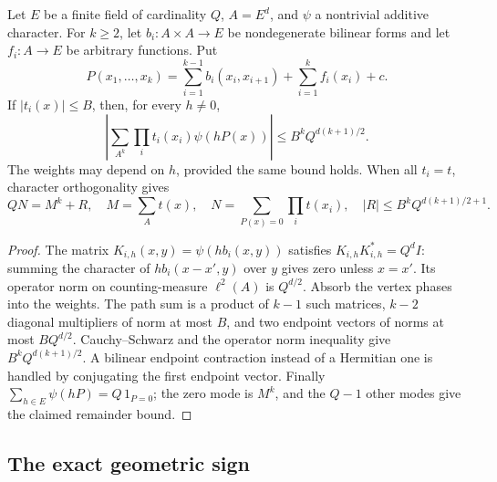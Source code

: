 \begin{lemma}
\label{lem:path}
Let $E$ be a finite field of cardinality $Q$, $A=E^d$, and $\psi$ a
nontrivial additive character.  For $k\ge2$, let $b_i:A\times A\to E$
be nondegenerate bilinear forms and let $f_i:A\to E$ be arbitrary
functions.  Put
\[
 P(x_1,\ldots,x_k)=\sum_{i=1}^{k-1}b_i(x_i,x_{i+1})
                         +\sum_{i=1}^k f_i(x_i)+c.
\]
If $|t_i(x)|\le B$, then, for every $h\ne0$,
\[
 \left|\sum_{A^k}\prod_i t_i(x_i)\psi(hP(x))\right|
       \le B^k Q^{d(k+1)/2}.
\]
The weights may depend on $h$, provided the same bound holds.  When all
$t_i=t$, character orthogonality gives
\[
 QN=M^k+R,\quad M=\sum_A t(x),\quad
 N=\sum_{P(x)=0}\prod_i t(x_i),\quad
 |R|\le B^k Q^{d(k+1)/2+1}.
\]
\end{lemma}
\begin{proof}
The matrix $K_{i,h}(x,y)=\psi(hb_i(x,y))$ satisfies
$K_{i,h}K_{i,h}^*=Q^d I$: summing the character of
$hb_i(x-x',y)$ over $y$ gives zero unless $x=x'$.  Its operator norm on
counting-measure $\ell^2(A)$ is $Q^{d/2}$.  Absorb the vertex phases into
the weights.  The path sum is a product of $k-1$ such matrices,
$k-2$ diagonal multipliers of norm at most $B$, and two endpoint vectors
of norms at most $BQ^{d/2}$.  Cauchy--Schwarz and the operator norm
inequality give $B^kQ^{d(k+1)/2}$.  A bilinear endpoint contraction instead
of a Hermitian one is handled by conjugating the first endpoint vector.
Finally
$\sum_{h\in E}\psi(hP)=Q\,1_{P=0}$; the zero mode is $M^k$, and the
$Q-1$ other modes give the claimed remainder bound.
\end{proof}

\subsection{The exact geometric sign}

